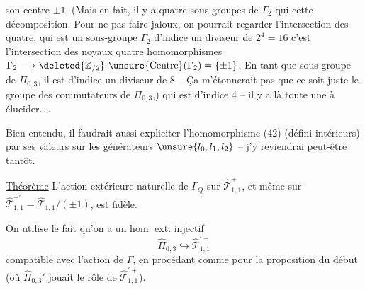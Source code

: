 son centre $\pm1$. (Mais en fait, il y a  quatre sous-groupes de $\Gamma_2$ qui  cette décomposition. Pour ne pas faire  jaloux, on pourrait regarder l'intersection des quatre, qui est un sous-groupe $\Gamma_2$ d'indice un diviseur de $2^4=16$ c'est l'intersection des noyaux  quatre homomorphismes $\Gamma_2\longrightarrow\deleted{\mathbb Z_{/2}}\ \unsure{\mathrm{Centre}}(\Gamma_2)=\{\pm1\}$,
En tant que sous-groupe de $\Pi_{0,3}$, il est d'indice un diviseur de $8$ -- Ça m'étonnerait pas que ce soit juste le groupe des commutateurs de $\Pi_{0,3}$,) qui est d'indice $4$ -- il y a là toute une  à élucider\ldots\,.

Bien entendu, il faudrait aussi expliciter l'homomorphisme (42) (défini   intérieurs) par ses valeurs sur les générateurs $\unsure{l_0,l_1,l_2}$ -- j'y reviendrai peut-être tantôt.

\uline{Théorème} L'action extérieure naturelle de $\Gamma_Q$ sur $\widehat{\mathcal T}_{1,1}^{+}$, et même sur $\widehat{\mathcal T}_{1,1}^{+\prime}=\widehat{\mathcal T}_{1,1}/(\pm1)$, est fidèle.

On utilise le fait qu'on a un hom. ext. injectif
\[
\widehat{\Pi}_{0,3}\hookrightarrow\widehat{\mathcal T}_{1,1}^{\prime+}
\]
compatible avec l'action de $\Gamma$, en procédant comme pour la proposition du début (où $\widehat{\Pi}_{0,3}'$ jouait le rôle de $\widehat{\mathcal T}_{1,1}^{\prime+}$).


